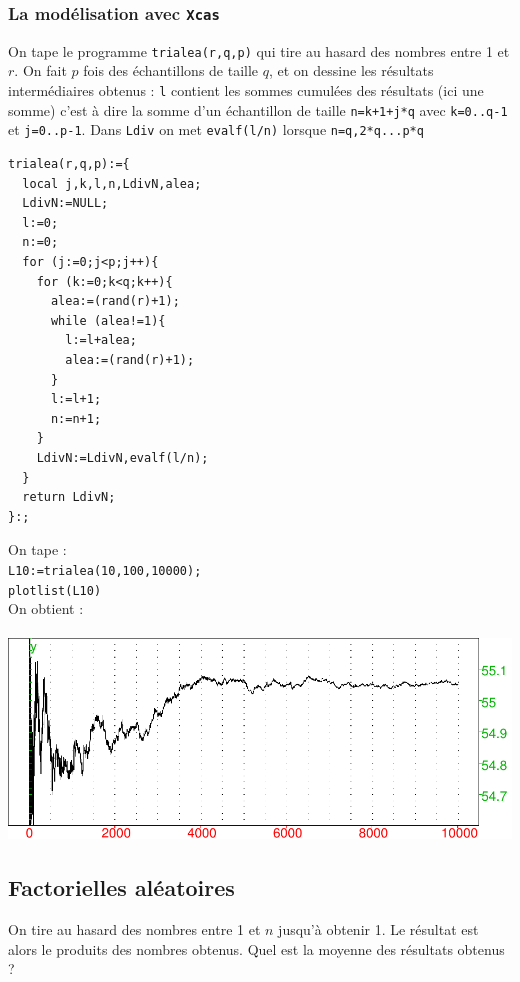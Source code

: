 \documentclass[a4paper,11pt]{book}
\begin{document}
\subsubsection{La mod\'elisation avec {\tt Xcas}}
On tape le programme {\tt trialea(r,q,p)} qui tire au hasard des nombres entre
1 et $r$. On fait $p$ fois des \'echantillons de taille $q$, et on dessine
les r\'esultats interm\'ediaires obtenus :
{\tt l} contient les sommes cumul\'ees des r\'esultats (ici une somme) c'est 
\`a dire la 
somme d'un \'echantillon de taille {\tt n=k+1+j*q} avec  {\tt k=0..q-1} et
{\tt j=0..p-1}. Dans {\tt Ldiv} on met {\tt evalf(l/n)}  lorsque 
{\tt n=q,2*q...p*q} 
\begin{verbatim}
trialea(r,q,p):={
  local j,k,l,n,LdivN,alea;
  LdivN:=NULL;
  l:=0;
  n:=0;
  for (j:=0;j<p;j++){
    for (k:=0;k<q;k++){
      alea:=(rand(r)+1);
      while (alea!=1){
        l:=l+alea;
        alea:=(rand(r)+1);
      }
      l:=l+1;
      n:=n+1;
    }
    LdivN:=LdivN,evalf(l/n);
  }
  return LdivN;
}:;
\end{verbatim}
On tape :\\
{\tt L10:=trialea(10,100,10000);}\\
{\tt plotlist(L10)}\\
On obtient :\\
\ \\
 \includegraphics[width=\textwidth]{trialea}
\subsection{Factorielles al\'eatoires}
On tire au hasard des nombres entre 1 et $n$ jusqu'\`a obtenir 1. Le 
r\'esultat est alors le produits des nombres obtenus. Quel est la moyenne des 
r\'esultats obtenus ?
\end{document}
